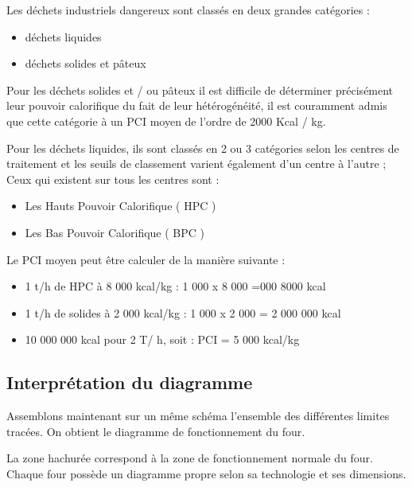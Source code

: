 Les déchets industriels dangereux sont classés en deux grandes catégories :

\begin{itemize}
 \item 	déchets liquides
 \item 	déchets solides et pâteux
\end{itemize}

Pour les déchets solides et / ou pâteux il est difficile de déterminer précisément leur pouvoir calorifique du fait de leur hétérogénéité, il est couramment admis que cette catégorie à un PCI moyen de l’ordre de 2000 Kcal / kg.
\vspace{0.3cm}

Pour les déchets liquides, ils sont classés en 2 ou 3 catégories selon les centres de traitement et les seuils de classement varient également d’un centre à l’autre ; Ceux qui existent sur tous les centres sont :

\begin{itemize}
 \item	Les Hauts Pouvoir Calorifique ( HPC )
 \item	Les Bas Pouvoir Calorifique  ( BPC )

\end{itemize}


Le PCI moyen peut être calculer de la manière suivante :
\begin{itemize}
   
 \item 1 t/h de HPC à 8 000 kcal/kg : 1 000 x 8 000 =000 	8000 kcal
 \item 1 t/h de solides à 2 000 kcal/kg	: 1 000 x 2 000 = 2 000 000 kcal
 \item 	10 000 000 kcal pour 2 T/ h, soit : PCI = 5 000 kcal/kg

\end{itemize}

\subsection{Interprétation du diagramme}


Assemblons maintenant sur un même schéma l’ensemble des différentes limites tracées. On obtient le diagramme de fonctionnement du four.
\vspace{0.3cm}

La zone hachurée correspond à la zone de fonctionnement normale du four.
Chaque four possède un diagramme propre selon sa technologie et ses dimensions.



